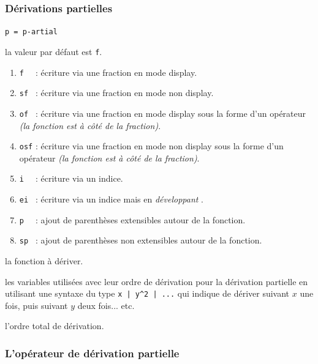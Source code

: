 \documentclass[12pt,a4paper]{book}
\theoremstyle{definition}
\newcommand\mwhyprefix[2]{%
	\texttt{#1 = #1-#2}%
}
\begin{document}
{{\subsubsection{Dérivations partielles}



 \hfill \mwhyprefix{p}{artial}

\IDoption{} la valeur par défaut est \verb+f+. 
\begin{enumerate}
	\item \verb+f  + : écriture via une fraction en mode display.

	\item \verb+sf + : écriture via une fraction en mode non display.

	\item \verb+of + : écriture via une fraction en mode display sous la forme d'un opérateur \emph{(la fonction est à côté de la fraction)}.

	\item \verb+osf+ : écriture via une fraction en mode non display sous la forme d'un opérateur \emph{(la fonction est à côté de la fraction)}.

	\medskip

	\item \verb+i  + : écriture via un indice.

	\item \verb+ei + : écriture via un indice mais en \emph{\og développant \fg}.

	\medskip

	\item \verb+p  + : ajout de parenthèses extensibles autour de la fonction.

	\item \verb+sp + : ajout de parenthèses non extensibles autour de la fonction.
\end{enumerate}


 la fonction à dériver.

 les variables utilisées avec leur ordre de dérivation pour la dérivation partielle en utilisant une syntaxe du type \verb+x | y^2 | ...+ qui indique de dériver suivant $x$ une fois, puis suivant $y$ deux fois... etc.

 l'ordre total de dérivation.




\subsubsection{L'opérateur de dérivation partielle} \label{tnsana-ope-partial-der}



}}
\end{document}
